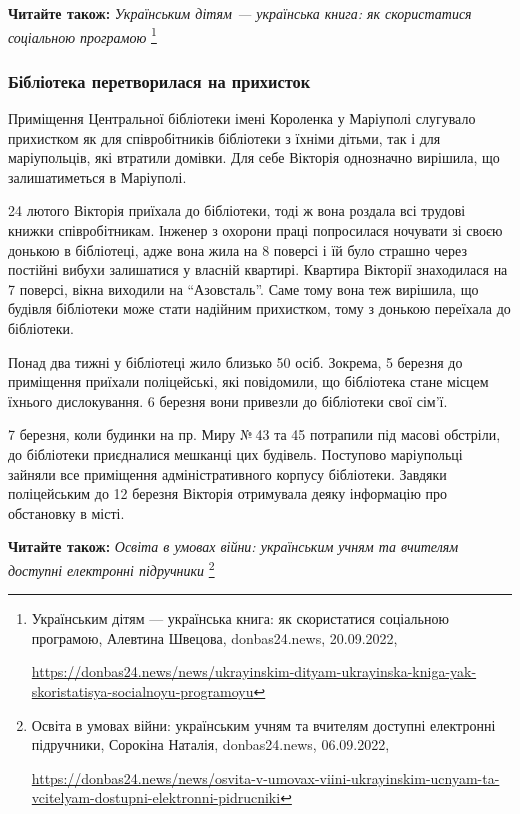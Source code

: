 \textbf{Читайте також:} \emph{Українським дітям — українська книга: як скористатися соціальною програмою}%
\footnote{Українським дітям — українська книга: як скористатися соціальною програмою, Алевтина Швецова, donbas24.news, 20.09.2022, \par%
\url{https://donbas24.news/news/ukrayinskim-dityam-ukrayinska-kniga-yak-skoristatisya-socialnoyu-programoyu}%
}

\subsubsection{Бібліотека перетворилася на прихисток}

Приміщення Центральної бібліотеки імені Короленка у Маріуполі слугувало
прихистком як для співробітників бібліотеки з їхніми дітьми, так і для
маріупольців, які втратили домівки. Для себе Вікторія однозначно вирішила, що
залишатиметься в Маріуполі.

24 лютого Вікторія приїхала до бібліотеки, тоді ж вона роздала всі трудові
книжки співробітникам. Інженер з охорони праці попросилася ночувати зі своєю
донькою в бібліотеці, адже вона жила на 8 поверсі і їй було страшно через
постійні вибухи залишатися у власній квартирі. Квартира Вікторії знаходилася на
7 поверсі, вікна виходили на \enquote{Азовсталь}. Саме тому вона теж вирішила, що
будівля бібліотеки може стати надійним прихистком, тому з донькою переїхала до
бібліотеки.

Понад два тижні у бібліотеці жило близько 50 осіб. Зокрема, 5 березня до
приміщення приїхали поліцейські, які повідомили, що бібліотека стане місцем
їхнього дислокування. 6 березня вони привезли до бібліотеки свої сім'ї.


7 березня, коли будинки на пр. Миру № 43 та 45 потрапили під масові обстріли,
до бібліотеки приєдналися мешканці цих будівель. Поступово маріупольці зайняли
все приміщення адміністративного корпусу бібліотеки. Завдяки поліцейським до 12
березня Вікторія отримувала деяку інформацію про обстановку в місті.

\textbf{Читайте також:} \emph{Освіта в умовах війни: українським учням та вчителям доступні електронні підручники}%
\footnote{Освіта в умовах війни: українським учням та вчителям доступні електронні підручники, Сорокіна Наталія, donbas24.news, 06.09.2022, \par%
\url{https://donbas24.news/news/osvita-v-umovax-viini-ukrayinskim-ucnyam-ta-vcitelyam-dostupni-elektronni-pidrucniki}%
}

